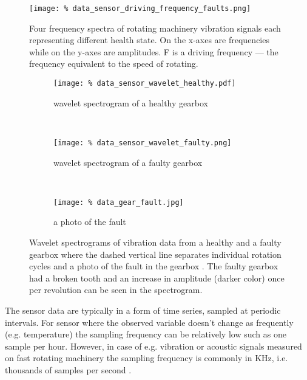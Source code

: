 \begin{figure}
    \texttt{[image: \%
        data\_sensor\_driving\_frequency\_faults.png]}
	\centering
	\caption{Four frequency spectra of rotating machinery vibration signals
	         each representing different health state. On the x-axes are frequencies while
	         on the y-axes are amplitudes. F is a driving frequency
	         --- the frequency equivalent to the speed of rotating.}
	\label{fig:data_sensor_driving_frequency_faults}
\end{figure}

\begin{figure}
    \centering
    \begin{subfigure}[b]{\textwidth}
        \texttt{[image: \%
            data\_sensor\_wavelet\_healthy.pdf]}
        \caption{wavelet spectrogram of a healthy gearbox}
    \end{subfigure}%
    \\
    \begin{subfigure}[b]{\textwidth}
        \texttt{[image: \%
            data\_sensor\_wavelet\_faulty.png]}
        \caption{wavelet spectrogram of a faulty gearbox}
    \end{subfigure}
    \\
    \begin{subfigure}[b]{\textwidth}
        \centering
        \texttt{[image: \%
            data\_gear\_fault.jpg]}
        \caption{a photo of the fault}
    \end{subfigure}
    \caption{Wavelet spectrograms of vibration data from a healthy and a faulty gearbox
             where the dashed vertical line separates individual rotation cycles
             \cite{lukany2018} and a photo of the fault in the gearbox \cite{data_acoustics_gear}.
             The faulty gearbox had a broken tooth and an increase in amplitude (darker color)
             once per revolution can be seen in the spectrogram.}
    \label{fig:data_sensor_wavelet}
\end{figure}

The sensor data are typically in a form of time series, sampled at periodic intervals.
For sensor where the observed variable doesn't change as frequently (e.g. temperature) the sampling frequency can be relatively low such as one sample per hour.
However, in case of e.g. vibration or acoustic signals measured on fast rotating machinery the sampling frequency is commonly in KHz, i.e. thousands of samples per second \cite{westernbearing}.

